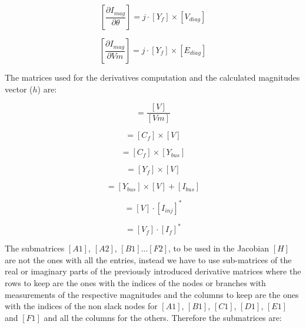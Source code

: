 \documentclass[nols,a4paper,twoside,symmetric,notoc,fleqn]{tufte-book}
\begin{document}

\begin{equation}
\left[ \frac{\partial I_{mag}}{\partial \theta} \right]   = j \cdot [Y_f] \times [V_{diag} ]
\end{equation}

\begin{equation}
\left[ \frac{\partial I_{mag}}{\partial Vm}  \right]  =j \cdot [Y_f] \times [E_{diag} ]
\end{equation}

The matrices used for the derivatives computation and the calculated magnitudes vector ($h$) are:

\begin{equation}
[E]=\frac{[V]}{[Vm]}
\end{equation}  

\begin{equation}
[V_f] = [C_f] \times [V]
\label{eq:voltage_from}
\end{equation}

\begin{equation}
[Y_f] = [C_f] \times [Y_{bus} ]
\label{eq:admittace_from}
\end{equation}

\begin{equation}
[I_f] = [Y_f] \times [V] 
\label{eq:current_from}
\end{equation}

\begin{equation}
[I_{inj}] = [Y_{bus}]  \times  [V] + [I_{bus}]
\label{eq:current_inj}
\end{equation}

\begin{equation}
[S_{inj}] = [V]  \cdot  [I_{inj}]^*
\label{eq:power_injection}
\end{equation}

\begin{equation}
[S_f] = [V_{f}] \cdot [I_{f}]^*
\label{eq:power_from}
\end{equation}

The submatrices $[A1]$, $[A2]$, $[B1]$...$[F2]$, to be used in the Jacobian $[H]$ are not the ones with all the entries, instead we have to use sub-matrices of the real or imaginary parts of the previously introduced derivative matrices where the rows to keep are the ones with the indices of the nodes or branches with measurements of the respective magnitudes and the columns to keep are the ones with the indices of the non slack nodes for $[A1]$, $[B1]$, $[C1]$, $[D1]$, $[E1]$ and $[F1]$ and all the columns for the others. Therefore the submatrices are:
\end{document}
